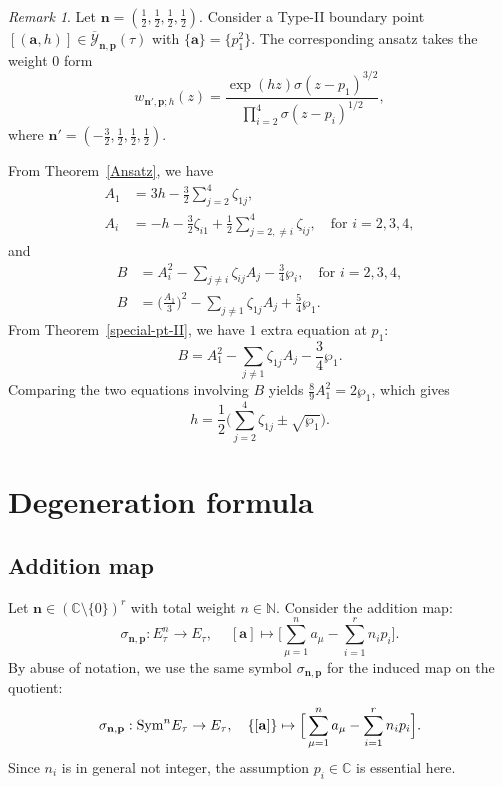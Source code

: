 \documentclass[11pt]{amsart}
\theoremstyle{remark}
\newtheorem{remark}[theorem]{Remark}
\numberwithin{equation}{section}
\newcommand{\Sym}{{\rm Sym}}
\begin{document}
\begin{remark}
Let $\mathbf{n} = (\frac{1}{2},\frac{1}{2},\frac{1}{2}, \frac{1}{2} )$. 
Consider a Type-II boundary point $[(\mathbf{a},h)] \in \overline{\mathcal{Y}}_{\mathbf{n},\mathbf{p}}(\tau)$ with $\{\mathbf{a}\} = \{p_1^2\}$. 
The corresponding ansatz takes the weight 0 form
\[
    w_{\mathbf{n}',\mathbf{p};h}(z) = \frac{\exp(hz) \sigma(z-p_1)^{3/2}  }{ \prod_{i=2}^4 \sigma(z-p_i)^{1/2} }, 
\]
where $\mathbf{n}' = (-\frac{3}{2},\frac{1}{2},\frac{1}{2},\frac{1}{2})$.

From Theorem~\ref{Ansatz}, we have
\[
\begin{split}
    A_1 &= 3h - \frac{3}{2} \sum_{j=2}^4 \zeta_{1j},
    \\
    A_i &= -h - \frac{3}{2} \zeta_{i1} + \frac{1}{2}\sum_{j=2,\neq i}^4 \zeta_{ij}, \quad \text{for } i =2,3,4,
\end{split}
\]
and
\[
\begin{split}
    B &= A_i^2 - \sum_{j \neq i} \zeta_{ij} A_j - \frac{3}{4} \wp_i, \quad \text{for } i=2,3,4,
    \\
    B &= \Big( \frac{A_1}{3} \Big)^2  - \sum_{j \neq 1} \zeta_{1j} A_j + \frac{5}{4}\wp_1.
\end{split}
\]
From Theorem~\ref{special-pt-II}, we have $1$ extra equation at $p_1$:
\[
    B = A_1^2 - \sum_{j \neq 1} \zeta_{1j} A_j - \frac{3}{4} \wp_1. 
\]
Comparing the two equations involving $B$ yields $\frac{8}{9}A_1^2 = 2\wp_1$, which gives
\[
    h = \frac{1}{2} \Big( \sum_{j=2}^4 \zeta_{1j} \pm \sqrt{\wp_1} \Big).
\]
\end{remark}




\section{Degeneration formula}
\subsection{Addition map}
Let $\mathbf{n} \in ( \mathbb{C} \setminus \{ 0\} )^r$ with total weight $n\in \mathbb{N}$.
 Consider the  addition map:
\[
\sigma_{\mathbf{n},\mathbf{p}} : E_{\tau}^n \rightarrow E_{\tau}, \quad \
[\mathbf{a}] \mapsto \Big[\sum_{\mu=1}^n a_{\mu} - \sum_{i=1}^r n_ip_i \Big].
\]
By abuse of notation, we use the same symbol $\sigma_{\mathbf{n},\mathbf{p}}$ for the induced map on the quotient:
\begin{equation}\label{e:addmap}
\sigma_{\mathbf{n},\mathbf{p}} : \Sym^n E_{\tau} \rightarrow E_{\tau}, \quad \{[\mathbf{a}]\} \mapsto \Big[\sum_{\mu=1}^n a_{\mu} - \sum_{i=1}^r n_ip_i \Big].
\end{equation}
Since $n_i$ is in general not integer, the assumption $p_i \in \mathbb{C}$ is essential here.
\end{document}
